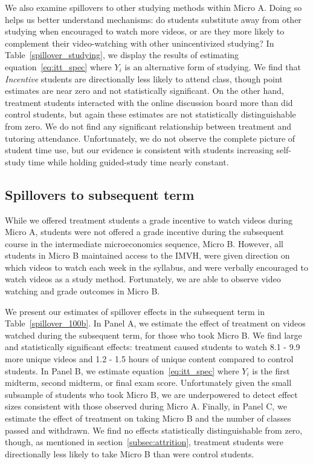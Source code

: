 \documentclass[12pt]{article}
\begin{document}
We also examine spillovers to other studying methods within Micro A. Doing so helps us better understand mechanisms: do students substitute away from other studying when encouraged to watch more videos, or are they more likely to complement their video-watching with other unincentivized studying?
In Table~\ref{spillover_studying}, we display the results of estimating equation~\ref{eq:itt_spec} where $Y_i$ is an alternative form of studying.
We find that \textit{Incentive} students are directionally less likely to attend class, though point estimates are near zero and not statistically significant.
On the other hand, treatment students interacted with the online discussion board more than did control students, but again these estimates are not statistically distinguishable from zero.
We do not find any significant relationship between treatment and tutoring attendance.
Unfortunately, we do not observe the complete picture of student time use, but our evidence is consistent with students increasing self-study time while holding guided-study time nearly constant.

\subsection{Spillovers to subsequent term}\label{subsec:spillovers_micro_b}

While we offered treatment students a grade incentive to watch videos during Micro A, students were not offered a grade incentive during the subsequent course in the intermediate microeconomics sequence, Micro B. However, all students in Micro B maintained access to the IMVH, were given direction on which videos to watch each week in the syllabus, and were verbally encouraged to watch videos as a study method.
Fortunately, we are able to observe video watching and grade outcomes in Micro B.

We present our estimates of spillover effects in the subsequent term in Table~\ref{spillover_100b}.
In Panel A, we estimate the effect of treatment on videos watched during the subsequent term, for those who took Micro B. We find large and statistically significant effects: treatment caused students to watch 8.1 - 9.9 more unique videos and 1.2 - 1.5 hours of unique content compared to control students.
In Panel B, we estimate equation~\ref{eq:itt_spec} where $Y_i$ is the first midterm, second midterm, or final exam score.
Unfortunately given the small subsample of students who took Micro B, we are underpowered to detect effect sizes consistent with those observed during Micro A. Finally, in Panel C, we estimate the effect of treatment on taking Micro B and the number of classes passed and withdrawn.
We find no effects statistically distinguishable from zero, though, as mentioned in section~\ref{subsec:attrition}, treatment students were directionally less likely to take Micro B than were control students.
\end{document}
